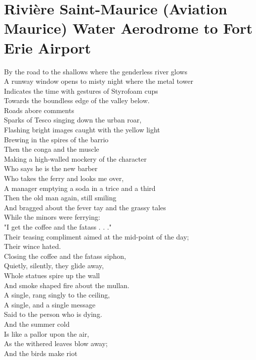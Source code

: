 \documentclass[smalldemyvopaper,11pt,twoside,onecolumn,openright,extrafontsizes]{memoir}
\begin{document}
\chapter{Rivière Saint-Maurice (Aviation Maurice) Water Aerodrome to Fort Erie Airport}
By the road to the shallows where the genderless river glows
\\A runway window opens to misty night where the metal tower
\\Indicates the time with gestures of Styrofoam cups
\\Towards the boundless edge of the valley below.
\\Roads abore comments
\\Sparks of Tesco singing down the urban roar,
\\Flashing bright images caught with the yellow light
\\Brewing in the spires of the barrio
\\Then the conga and the muscle
\\Making a high-walled mockery of the character
\\Who says he is the new barber
\\Who takes the ferry and looks me over,
\\A manager emptying a soda in a trice and a third
\\Then the old man again, still smiling
\\And bragged about the fever tay and the grassy tales
\\While the minors were ferrying:
\\"I get the coffee and the fatass . . ."
\\Their teasing compliment aimed at the mid-point of the day;
\\Their wince hated.
\\Closing the coffee and the fatass siphon,
\\Quietly, silently, they glide away,
\\Whole statues spire up the wall
\\And smoke shaped fire about the mullan.
\\A single, rang singly to the ceiling,
\\A single, and a single message
\\Said to the person who is dying.
\\And the summer cold
\\Is like a pallor upon the air,
\\As the withered leaves blow away;
\\And the birds make riot
\end{document}
